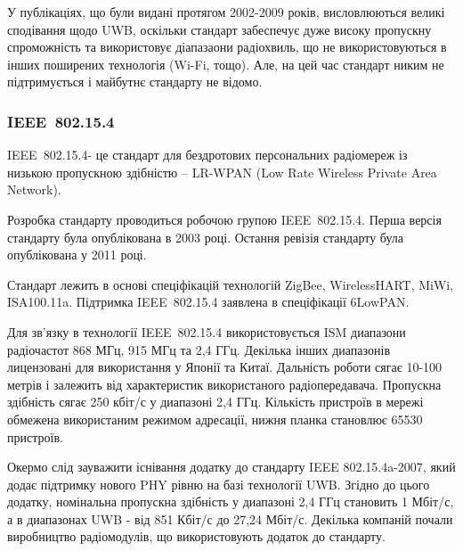 \documentclass[a4paper,ukrainian,utf8,nocolumnsxix,floatsection]{eskdtext}
\renewcommand\paragraph{\subsubsection}
\newcommand{\todoi}[1]{\todo[inline]{#1}}
\newcommand{\iee}[0]{IEEE~802.15.4\xspace}
\newcommand{\engtxt}[1]{\foreignlanguage{english}{#1}}
\begin{document}

У публікаціях, що були видані протягом 2002-2009 років, висловлюються великі сподівання щодо UWB, оскільки стандарт забеспечує дуже високу пропускну спроможність та використовує діапазаони радіохвиль, що не використовуються в інших поширених технологія (Wi-Fi, тощо). Але, на цей час стандарт никим не підтримується і майбутнє стандарту не відомо.


\paragraph{\iee} %
\label{par:iee}

\iee - це стандарт для бездротових персональних радіомереж із низькою пропускною здібністю – LR-WPAN (\engtxt{Low Rate Wireless Private Area Network}). 

Розробка стандарту проводиться робочою групою \iee. Перша версія стандарту була опублікована в 2003 році. Остання ревізія стандарту була опублікована у 2011 році. 

Стандарт лежить в основі спеціфікацій технологій ZigBee, WirelessHART, MiWi, ISA100.11a. Підтримка \iee заявлена в спеціфікації 6LowPAN.

Для зв’язку в технології \iee використовується ISM диапазони радіочастот 868 МГц, 915 МГц та 2,4 ГГц. Декілька інших диапазонів лицензовані для використання у Японії та Китаї. Дальність роботи сягає 10-100 метрів і залежить від характеристик використаного радіопередавача. Пропускна здібність сягає 250 кбіт/с у диапазоні 2,4 ГГц. Кількість пристроїв в мережі обмежена використаним режимом адресації, нижня планка становлює 65530 пристроїв.

Окермо слід зауважити існівання додатку до стандарту IEEE 802.15.4a-2007, який додає підтримку нового PHY рівню на базі технології UWB. Згідно до цього додатку, номінальна пропускна здібність у диапазоні 2,4 ГГц становить 1 Мбіт/с, а в диапазонах UWB - від 851 Кбіт/с до 27,24 Мбіт/с. Декілька компаній почали виробництво радіомодулів, що використовують додаток до стандарту.



\todoi{інші технології?}
\end{document}
